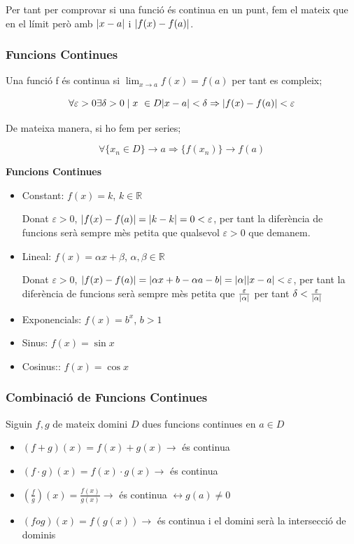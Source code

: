 \documentclass[12pt]{article}
\newcommand{\R}{\mathbb{R}}
\begin{document}
Per tant per comprovar si una funció és continua en un punt, fem el mateix que en el límit però amb $\abs{x-a}$ i $\abs{f(x) - f(a)}$.

\subsubsection{Funcions Continues}

Una funció f és continua si $\lim_{x\rightarrow a} f(x) = f(a)$ per tant es compleix;

\[\forall \varepsilon > 0 \exists \delta > 0 \mid x \in D \abs{x-a} < \delta \Rightarrow \abs{f(x) - f(a)} < \varepsilon\]

De mateixa manera, si ho fem per series;

\[\forall \{x_n \in D\} \rightarrow a \Rightarrow \{f(x_n)\} \rightarrow f(a)\]

\textbf{Funcions Continues}

\begin{itemize}
    \item Constant: $f(x) = k$, $k \in \R$
    
    Donat $\varepsilon > 0$, $\abs{f(x) - f(a)} = \abs{k-k} = 0 < \varepsilon$, per tant la diferència de funcions serà sempre mès petita que qualsevol $\varepsilon > 0$ que demanem.

    \item Lineal: $f(x) = \alpha x + \beta$, $\alpha, \beta \in \R$
    
    Donat $\varepsilon > 0$, $\abs{f(x) - f(a)} = \abs{\alpha x + b- \alpha a - b} = \abs{\alpha}\abs{x-a} < \varepsilon$, per tant la diferència de funcions serà sempre mès petita que $\frac{\varepsilon}{\abs{\alpha}}$ per tant $\delta < \frac{\varepsilon}{\abs{\alpha}}$

    \item Exponencials: $f(x) = b^x$, $b > 1$
    \item Sinus: $f(x) = \sin x$
    \item Cosinus:: $f(x) = \cos x$
\end{itemize}

\subsubsection{Combinació de Funcions Continues}

Siguin $f,g$ de mateix domini $D$ dues funcions continues en $a \in D$

\begin{itemize}
    \item $(f+g)(x) = f(x) + g(x) \rightarrow$ és continua
    \item $(f\cdot g)(x) = f(x) \cdot g(x) \rightarrow$ és continua
    \item $(\frac{f}{g})(x) = \frac{f(x)}{g(x)}\rightarrow$ és continua $\leftrightarrow g(a) \neq 0$ 
    \item $(f o g)(x) = f(g(x)) \rightarrow$ és continua i el domini serà la intersecció de dominis
\end{itemize}
\end{document}
